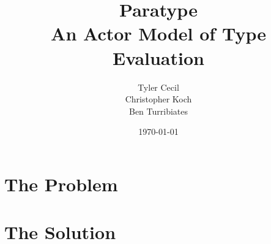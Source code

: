 \documentclass{beamer}
\begin{document}
\title[Paratype]{Paratype \\ An Actor Model of Type Evaluation}
\author{Tyler Cecil \\ Christopher Koch \\ Ben Turribiates}
\date{\today}

\frame{\titlepage}

\section{The Problem}

\section{The Solution}
\end{document}
